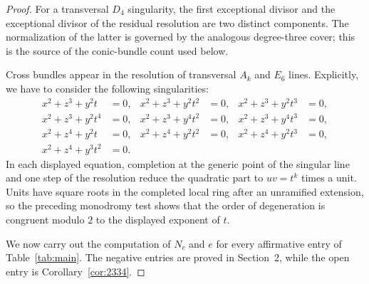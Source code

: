 \documentclass[a4paper]{amsart}
\theoremstyle{plain}
\theoremstyle{definition}
\theoremstyle{remark}
\numberwithin{equation}{section}
\begin{document}
\begin{proof}
For a transversal $D_4$ singularity, the first exceptional divisor and
the exceptional divisor of the residual resolution are two distinct
components.  The normalization of the latter is governed by the analogous
degree-three cover; this is the source of the conic-bundle count used
below.

Cross bundles appear in the resolution of transversal $A_{k}$ and $E_{6}$ lines. Explicitly, we have to consider the following singularities:
\begin{align*}
x^{2}+z^{3}+y^{2}t&=0, &
x^{2}+z^{3}+y^{2}t^{2}&=0, &
x^{2}+z^{3}+y^{2}t^{3}&=0, \\
x^{2}+z^{3}+y^{2}t^{4}&=0, &
x^{2}+z^{3}+y^{4}t^{2}&=0, &
x^{2}+z^{3}+y^{4}t^{3}&=0, \\
x^{2}+z^{4}+y^{2}t&=0, &
x^{2}+z^{4}+y^{2}t^{2}&=0, &
x^{2}+z^{4}+y^{2}t^{3}&=0, \\
x^{2}+z^{4}+y^{3}t^{2}&=0.
\end{align*}
In each displayed equation, completion at the generic point of the
singular line and one step of the resolution reduce the quadratic part to
$uv=t^k$ times a unit.  Units have square roots in the completed local
ring after an unramified extension, so the preceding monodromy test shows
that the order of degeneration is congruent modulo $2$ to the displayed
exponent of $t$.

We now carry out the computation of \(N_c\) and \(e\) for every affirmative
entry of Table~\ref{tab:main}.  The negative entries are proved in
Section~2, while the open entry is Corollary~\ref{cor:2334}.
\medskip




\end{proof}
\end{document}
